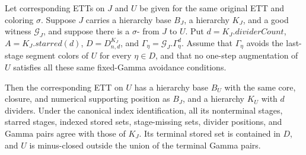 \begin{helper}
Let corresponding ETTs on $J$ and $U$ be given for the same original ETT
and coloring $\sigma$.  Suppose $J$ carries a hierarchy base $B_J$, a
hierarchy $K_J$, and a good witness $\mathcal G_J$, and suppose there is a
$\sigma$- from $J$ to $U$.  Put
$d=K_J.\mathit{dividerCount}$, $A=K_J.\mathit{starred}(d)$,
$D=D^{K_J}_{n,d}$, and $\Gamma_\eta=\mathcal G_J.\Gamma^d_\eta$.  Assume
that $\Gamma_\eta$ avoids the last-stage segment colors of $U$ for every
$\eta\in D$, and that no one-step augmentation of $U$ satisfies all these
same fixed-Gamma avoidance conditions.

Then the corresponding ETT on $U$ has a hierarchy base $B_U$ with the
same core, closure, and numerical supporting position as $B_J$, and a
hierarchy $K_U$ with $d$ dividers.  Under the canonical index
identification, all its nonterminal stages, starred stages, indexed stored
sets, stage-missing sets, divider positions, and Gamma pairs agree with
those of $K_J$.  Its terminal stored set is contained in $D$, and $U$ is
minus-closed outside the union of the terminal Gamma pairs.
\end{helper}
